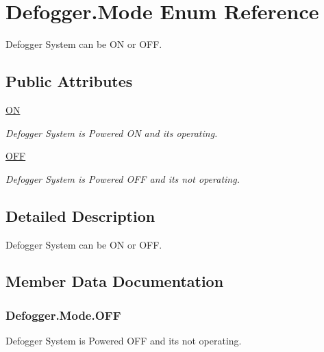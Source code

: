 \hypertarget{enum_defogger_1_1_mode}{}\section{Defogger.\+Mode Enum Reference}
\label{enum_defogger_1_1_mode}


Defogger System can be O\+N or O\+F\+F.  


\subsection*{Public Attributes}
\begin{DoxyCompactItemize}
\item 
\hyperlink{enum_defogger_1_1_mode_a76d70f9c05cdf1a27e30af22fb60da1b}{O\+N}
\begin{DoxyCompactList}\small\item\em Defogger System is Powered O\+N and its operating. \end{DoxyCompactList}\item 
\hyperlink{enum_defogger_1_1_mode_ad104c01df699935ca8a01414a67db888}{O\+F\+F}
\begin{DoxyCompactList}\small\item\em Defogger System is Powered O\+F\+F and its not operating. \end{DoxyCompactList}\end{DoxyCompactItemize}


\subsection{Detailed Description}
Defogger System can be O\+N or O\+F\+F. 

\subsection{Member Data Documentation}
\hypertarget{enum_defogger_1_1_mode_ad104c01df699935ca8a01414a67db888}{}
\subsubsection[{O\+F\+F}]{\setlength{\rightskip}{0pt plus 5cm}Defogger.\+Mode.\+O\+F\+F}\label{enum_defogger_1_1_mode_ad104c01df699935ca8a01414a67db888}


Defogger System is Powered O\+F\+F and its not operating. 

